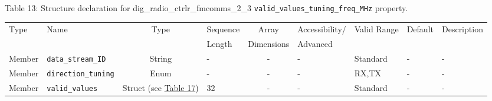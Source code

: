 \documentclass{article}
\def\comp{dig\_radio\_ctrlr\_fmcomms\_2\_3}
\begin{document}
\begin{landscape}
	\noindent Table \hypertarget{tab13}{13}: Structure declaration for \comp{} \verb+valid_values_tuning_freq_MHz+ property.
	\begin{scriptsize}
		\noindent\begin{longtable}{|p{1.8cm}|p{3.6cm}|c|p{2cm}|c|p{2cm}|p{1.7cm}|p{0.8cm}|p{4.97cm}|}
			\hline
			\rowcolor{blue}
			Type         & Name                                & Type & Sequence & Array      & Accessibility/ & Valid Range  & Default & Description                                                                                                                                                                                                                       \\
			\rowcolor{blue}
			             &                                     &      & Length   & Dimensions & Advanced       &              &         &                                                                                                                                                                                                                             \\
			\hline
			Member       & \verb+data_stream_ID+               & String& -       & -          & -              & Standard     & -       & - \\
			\hline
			Member       & \verb+direction_tuning+             & Enum  & -       & -          & -              & RX,TX        & -       & - \\
			\hline
			Member       & \verb+valid_values+                 & Struct (see \hyperlink{tab17}{Table 17}) & 32      & -          & -              & Standard & -       & - \\
			\hline
		\end{longtable}
	\end{scriptsize}


\end{landscape}
\end{document}
